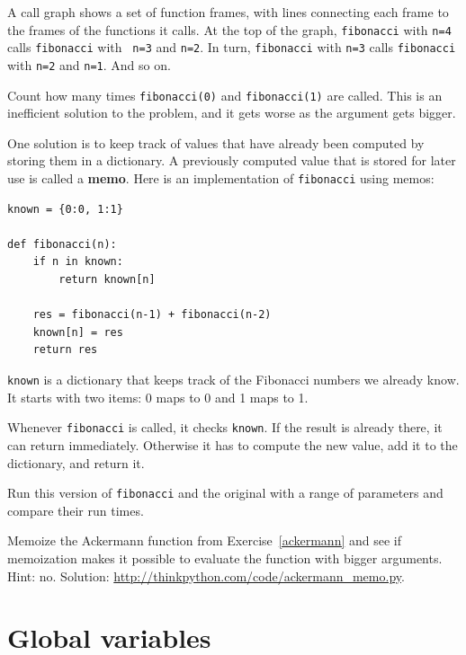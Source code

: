 \documentclass[10pt]{book}
\begin{document}
A call graph shows a set of function frames, with lines connecting each
frame to the frames of the functions it calls.  At the top of the
graph, {\tt fibonacci} with {\tt n=4} calls {\tt fibonacci} with {\tt
n=3} and {\tt n=2}.  In turn, {\tt fibonacci} with {\tt n=3} calls
{\tt fibonacci} with {\tt n=2} and {\tt n=1}.  And so on.

Count how many times {\tt fibonacci(0)} and {\tt fibonacci(1)} are
called.  This is an inefficient solution to the problem, and it gets
worse as the argument gets bigger.

One solution is to keep track of values that have already been
computed by storing them in a dictionary.  A previously computed value
that is stored for later use is called a {\bf memo}.  Here is an
implementation of {\tt fibonacci} using memos:

\begin{verbatim}
known = {0:0, 1:1}

def fibonacci(n):
    if n in known:
        return known[n]

    res = fibonacci(n-1) + fibonacci(n-2)
    known[n] = res
    return res
\end{verbatim}
%
{\tt known} is a dictionary that keeps track of the Fibonacci
numbers we already know.  It starts with
two items: 0 maps to 0 and 1 maps to 1.

Whenever {\tt fibonacci} is called, it checks {\tt known}.
If the result is already there, it can return
immediately.  Otherwise it has to
compute the new value, add it to the dictionary, and return it.

\begin{exercise}

Run this version of {\tt fibonacci} and the original with
a range of parameters and compare their run times.

\end{exercise}

\begin{exercise}

Memoize the Ackermann function from Exercise~\ref{ackermann} and see if
memoization makes it possible to evaluate the function with bigger
arguments.  Hint: no.
Solution: \url{http://thinkpython.com/code/ackermann_memo.py}.

\end{exercise}


\section{Global variables}
\end{document}
